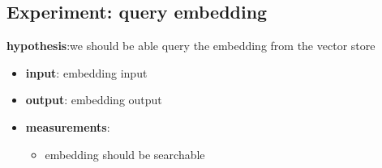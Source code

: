 \documentclass[conference]{IEEEtran}
\begin{document}
\subsection{Experiment: query embedding}
\textbf{hypothesis}:we should be able query the embedding from the vector store
\begin{itemize}
    \item \textbf{input}: embedding input
    \item \textbf{output}: embedding output
    \item \textbf{measurements}:
    \begin{itemize}
        \item embedding should be searchable
    \end{itemize}
\end{itemize}







\end{document}
